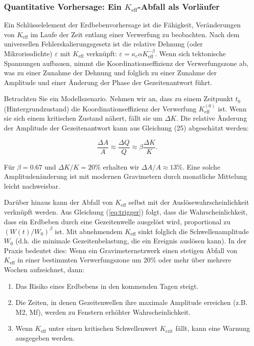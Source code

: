 \documentclass[12pt,a4paper]{article}
\theoremstyle{remark}
\begin{document}
	\subsubsection{Quantitative Vorhersage: Ein \(K_{\mathrm{eff}}\)-Abfall als Vorläufer}
	\label{subsubsec:precursor}
	
	Ein Schlüsselelement der Erdbebenvorhersage ist die Fähigkeit, Veränderungen von \(K_{\mathrm{eff}}\) im Laufe der Zeit entlang einer Verwerfung zu beobachten. Nach dem universellen Fehlerskalierungsgesetz ist die relative Dehnung (oder Mikrorissdichte) \(\varepsilon\) mit \(K_{\mathrm{eff}}\) verknüpft: \(\varepsilon = \kappa_c \alpha K_{\mathrm{eff}}^{-\beta}\). Wenn sich tektonische Spannungen aufbauen, nimmt die Koordinationseffizienz der Verwerfungszone ab, was zu einer Zunahme der Dehnung und folglich zu einer Zunahme der Amplitude und einer Änderung der Phase der Gezeitenantwort führt.
	
	Betrachten Sie ein Modellszenario. Nehmen wir an, dass zu einem Zeitpunkt \(t_0\) (Hintergrundzustand) die Koordinationseffizienz der Verwerfung \(K_{\mathrm{eff}}^{(0)}\) ist. Wenn sie sich einem kritischen Zustand nähert, fällt sie um \(\Delta K\). Die relative Änderung der Amplitude der Gezeitenantwort kann aus Gleichung (25) abgeschätzt werden:
	
	\[
	\frac{\Delta A}{A} \approx \frac{\Delta Q}{Q} \approx \beta \frac{\Delta K}{K}.
	\]
	
	Für \(\beta = 0.67\) und \(\Delta K/K = 20\%\) erhalten wir \(\Delta A/A \approx 13\%\). Eine solche Amplitudenänderung ist mit modernen Gravimetern durch monatliche Mittelung leicht nachweisbar.
	
	Darüber hinaus kann der Abfall von \(K_{\mathrm{eff}}\) selbst mit der Auslösewahrscheinlichkeit verknüpft werden. Aus Gleichung (\ref{eq:trigger}) folgt, dass die Wahrscheinlichkeit, dass ein Erdbeben durch eine Gezeitenwelle ausgelöst wird, proportional zu \((W(t)/W_0)^{\beta}\) ist. Mit abnehmendem \(K_{\mathrm{eff}}\) sinkt folglich die Schwellenamplitude \(W_0\) (d.h. die minimale Gezeitenbelastung, die ein Ereignis auslösen kann). In der Praxis bedeutet dies: Wenn ein Gravimeternetzwerk einen stetigen Abfall von \(K_{\mathrm{eff}}\) in einer bestimmten Verwerfungszone um 20\% oder mehr über mehrere Wochen aufzeichnet, dann:
	
	\begin{enumerate}
		\item Das Risiko eines Erdbebens in den kommenden Tagen steigt.
		\item Die Zeiten, in denen Gezeitenwellen ihre maximale Amplitude erreichen (z.B. M2, Mf), werden zu Fenstern erhöhter Wahrscheinlichkeit.
		\item Wenn \(K_{\mathrm{eff}}\) unter einen kritischen Schwellenwert \(K_{\text{crit}}\) fällt, kann eine Warnung ausgegeben werden.
	\end{enumerate}
	
\end{document}
